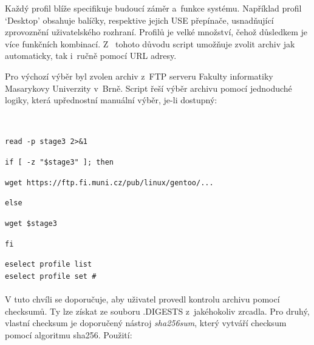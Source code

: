 \documentclass[12pt,a4paper,twoside,]{article}
\begin{document}
{{Každý profil blíže specifikuje budoucí záměr a~funkce systému. Například profil
‘Desktop’ obsahuje balíčky, respektive jejich USE přepínače, usnadňující zprovoznění uživatelského rozhraní.
Profilů je velké množství, čehož důsledkem je více funkčních kombinací. Z~ tohoto důvodu script umožňuje zvolit archiv jak automaticky, tak i~ručně pomocí URL adresy. 

Pro výchozí výběr byl zvolen archiv z~FTP serveru Fakulty informatiky
Masarykovy Univerzity v~Brně. Script řeší výběr archivu pomocí jednoduché logiky,
která upřednostní manuální výběr, je-li dostupný:}\\

{\hspace*{+1.5em}\texttt{read -p stage3 2>\&1}\\
{\hspace*{+1.5em}\texttt{if [ -z "\$stage3" ]; then}\\
{\hspace*{+1.5em}\texttt{\hspace*{+1.5em}wget https://ftp.fi.muni.cz/pub/linux/gentoo/...\\}
{\hspace*{+1.5em}\texttt{else}\\
{\hspace*{+1.5em}\texttt{\hspace*{+1.5em}wget \$stage3}\\
{\hspace*{+1.5em}\texttt{fi}\\

\hspace{-1.5em}{Nesprávně zvolený profil lze po dokončení instalace změnit pomocí:\\}

\texttt{eselect profile list}\\
\texttt{\hspace*{--1.5em}eselect profile set \#}\\

\hspace{-1.5em}{Uživatel by však měl mít na paměti, že změna profilu může, v~některých případech
vést až k~překompilování celého systému.}\\

\hspace{-1.5em}V tuto chvíli se doporučuje, aby uživatel provedl kontrolu archivu pomocí checksumů.
Ty lze získat ze souboru .DIGESTS z~jakéhokoliv zrcadla. Pro druhý, vlastní checksum je doporučený nástroj \textit{sha256sum}, který vytváří checksum pomocí algoritmu sha256. Použití:

}}}}}}}
\end{document}
